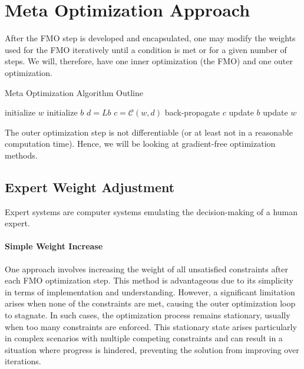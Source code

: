 \section{Meta Optimization Approach}
After the FMO step is developed and encapsulated, one may modify the weights used for the FMO iteratively until a condition is met or for a given number of steps.
We will, therefore, have one inner optimization (the FMO) and one outer optimization.
\begin{center}
	\begin{minipage}{.55\linewidth}
		\begin{algorithm}[H]
			\caption{Meta Optimization Algorithm Outline}
			\label{alg:meta_optim}
			\begin{algorithmic}
				\State initialize $w$
				\Repeat
					\State initialize $b$ 
					\Repeat
						\State \textcolor{Prune}{ $d = Lb$  }
						\State \textcolor{Prune}{ $c = \mathcal{C}(w, d)$  }
						\State \textcolor{Prune}{ back-propagate $c$ }
						\State \textcolor{Prune}{ update $b$ }
					 
					\State update $w$
			\end{algorithmic}
		\end{algorithm}
	\end{minipage}
\end{center}
The outer optimization step is not differentiable (or at least not in a reasonable computation time).
Hence, we will be looking at gradient-free optimization methods.

\subsection{Expert Weight Adjustment}
Expert systems are computer systems emulating the decision-making of a human expert.

\paragraph{Simple Weight Increase}
One approach involves increasing the weight of all unsatisfied constraints after each FMO optimization step.
This method is advantageous due to its simplicity in terms of implementation and understanding.
However, a significant limitation arises when none of the constraints are met, causing the outer optimization loop to stagnate.
In such cases, the optimization process remains stationary, usually when too many constraints are enforced.
This stationary state arises particularly in complex scenarios with multiple competing constraints and can result in a situation where progress is hindered, preventing the solution from improving over iterations.

